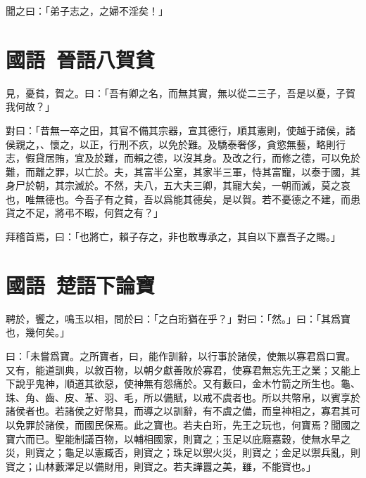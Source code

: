 聞之曰：「弟子志之，之婦不淫矣！」

\section[叔向賀貧\quad{\small 國語 晉語八}]{{\normalsize 國語\ 晉語八}\quad {}賀貧}
見，憂貧，賀之。曰：「吾有卿之名，而無其實，無以從二三子，吾是以憂，子賀我何故？」

對曰：「昔無一卒之田，其官不備其宗器，宣其德行，順其憲則，使越于諸侯，諸侯親之，、懷之，以正，行刑不疚，以免於難。及驕泰奢侈，貪慾無藝，略則行志，假貸居賄，宜及於難，而賴之德，以沒其身。及改之行，而修之德，可以免於難，而離之罪，以亡於。夫，其富半公室，其家半三軍，恃其富寵，以泰于國，其身尸於朝，其宗滅於。不然，夫八，五大夫三卿，其寵大矣，一朝而滅，莫之哀也，唯無德也。今吾子有之貧，吾以爲能其德矣，是以賀。若不憂德之不建，而患貨之不足，將弔不暇，何賀之有？」

拜稽首焉，曰：「也將亡，賴子存之，非也敢專承之，其自以下嘉吾子之賜。」

\theendnotes

\section[王孫圉論楚寶\quad{\small 國語 楚語下}]{{\normalsize 國語\ 楚語下}\quad {}論寶}
聘於，饗之，鳴玉以相，問於曰：「之白珩猶在乎？」對曰：「然。」曰：「其爲寶也，幾何矣。」

曰：「未嘗爲寶。之所寶者，曰，能作訓辭，以行事於諸侯，使無以寡君爲口實。又有，能道訓典，以敘百物，以朝夕獻善敗於寡君，使寡君無忘先王之業；又能上下說乎鬼神，順道其欲惡，使神無有怨痛於。又有藪曰，金木竹箭之所生也。龜、珠、角、齒、皮、革、羽、毛，所以備賦，以戒不虞者也。所以共幣帛，以賓享於諸侯者也。若諸侯之好幣具，而導之以訓辭，有不虞之備，而皇神相之，寡君其可以免罪於諸侯，而國民保焉。此之寶也。若夫白珩，先王之玩也，何寶焉？聞國之寶六而已。聖能制議百物，以輔相國家，則寶之；玉足以庇廕嘉穀，使無水旱之災，則寶之；龜足以憲臧否，則寶之；珠足以禦火災，則寶之；金足以禦兵亂，則寶之；山林藪澤足以備財用，則寶之。若夫譁囂之美，雖，不能寶也。」

